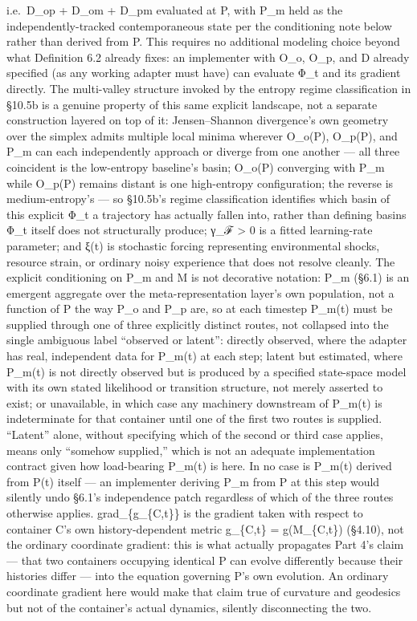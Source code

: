 \documentclass[
]{article}
\begin{document}
i.e.~D\_op + D\_om + D\_pm evaluated at P, with P\_m held as the
independently-tracked contemporaneous state per the conditioning note
below rather than derived from P. This requires no additional modeling
choice beyond what Definition 6.2 already fixes: an implementer with
O\_o, O\_p, and D already specified (as any working adapter must have)
can evaluate Φ\_t and its gradient directly. The multi-valley structure
invoked by the entropy regime classification in §10.5b is a genuine
property of this same explicit landscape, not a separate construction
layered on top of it: Jensen--Shannon divergence's own geometry over the
simplex admits multiple local minima wherever O\_o(P), O\_p(P), and P\_m
can each independently approach or diverge from one another --- all
three coincident is the low-entropy baseline's basin; O\_o(P) converging
with P\_m while O\_p(P) remains distant is one high-entropy
configuration; the reverse is medium-entropy's --- so §10.5b's regime
classification identifies which basin of this explicit Φ\_t a trajectory
has actually fallen into, rather than defining basins Φ\_t itself does
not structurally produce; γ\_ℱ \textgreater{} 0 is a fitted
learning-rate parameter; and ξ(t) is stochastic forcing representing
environmental shocks, resource strain, or ordinary noisy experience that
does not resolve cleanly. The explicit conditioning on P\_m and M is not
decorative notation: P\_m (§6.1) is an emergent aggregate over the
meta-representation layer's own population, not a function of P the way
P\_o and P\_p are, so at each timestep P\_m(t) must be supplied through
one of three explicitly distinct routes, not collapsed into the single
ambiguous label ``observed or latent'': directly observed, where the
adapter has real, independent data for P\_m(t) at each step; latent but
estimated, where P\_m(t) is not directly observed but is produced by a
specified state-space model with its own stated likelihood or transition
structure, not merely asserted to exist; or unavailable, in which case
any machinery downstream of P\_m(t) is indeterminate for that container
until one of the first two routes is supplied. ``Latent'' alone, without
specifying which of the second or third case applies, means only
``somehow supplied,'' which is not an adequate implementation contract
given how load-bearing P\_m(t) is here. In no case is P\_m(t) derived
from P(t) itself --- an implementer deriving P\_m from P at this step
would silently undo §6.1's independence patch regardless of which of the
three routes otherwise applies. grad\_\{g\_\{C,t\}\} is the gradient
taken with respect to container C's own history-dependent metric
g\_\{C,t\} = g(M\_\{C,t\}) (§4.10), not the ordinary coordinate
gradient: this is what actually propagates Part 4's claim --- that two
containers occupying identical P can evolve differently because their
histories differ --- into the equation governing P's own evolution. An
ordinary coordinate gradient here would make that claim true of
curvature and geodesics but not of the container's actual dynamics,
silently disconnecting the two.
\end{document}
